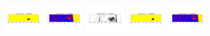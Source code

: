 \documentclass[11pt]{article}
\begin{document}
\includegraphics[width=0.158333333333\textwidth]{frame0009fig1.png}
\includegraphics[width=0.158333333333\textwidth]{frame0009fig2.png}
\vskip 10pt 
\includegraphics[width=0.158333333333\textwidth]{frame0010fig0.png}
\includegraphics[width=0.158333333333\textwidth]{frame0010fig1.png}
\includegraphics[width=0.158333333333\textwidth]{frame0010fig2.png}
\end{document}
